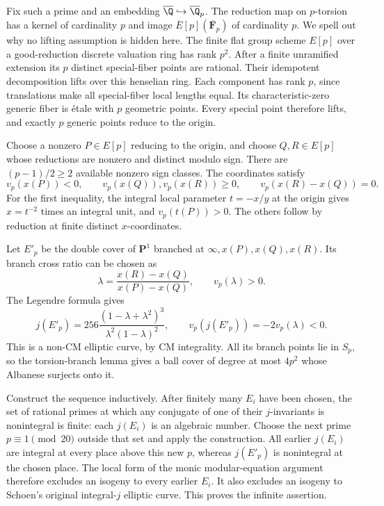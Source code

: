 Fix such a prime and an embedding $\overline{\Q}\hookrightarrow
\overline{\Q}_p$.  The reduction map on $p$-torsion has a kernel of
cardinality $p$ and image $\overline E[p](\overline{\mathbf F}_p)$ of
cardinality $p$.  We spell out why no lifting assumption is hidden here.
The finite flat group scheme $E[p]$ over a good-reduction discrete
valuation ring has rank $p^2$.  After a finite unramified extension its
$p$ distinct special-fiber points are rational.  Their idempotent
decomposition lifts over this henselian ring.  Each component has rank
$p$, since translations make all special-fiber local lengths equal.
Its characteristic-zero generic fiber is \'{e}tale with $p$ geometric
points.  Every special point therefore lifts, and exactly $p$ generic
points reduce to the origin.

Choose a nonzero $P\in E[p]$ reducing to the origin, and choose
$Q,R\in E[p]$ whose reductions are nonzero and distinct modulo sign.
There are $(p-1)/2\geq2$ available nonzero sign classes.  The coordinates
satisfy
\[
 v_p(x(P))<0,\qquad
 v_p(x(Q)),v_p(x(R))\geq0,\qquad
 v_p(x(R)-x(Q))=0.
\]
For the first inequality, the integral local parameter $t=-x/y$ at the
origin gives $x=t^{-2}$ times an integral unit, and $v_p(t(P))>0$.
The others follow by reduction at finite distinct $x$-coordinates.

Let $E'_p$ be the double cover of $\mathbf P^1$ branched at
$\infty,x(P),x(Q),x(R)$.  Its branch cross ratio can be chosen as
\[
 \lambda=\frac{x(R)-x(Q)}{x(P)-x(Q)},\qquad v_p(\lambda)>0.
\]
The Legendre formula gives
\[
 j(E'_p)=256\frac{(1-\lambda+\lambda^2)^3}
                         {\lambda^2(1-\lambda)^2},
 \qquad v_p(j(E'_p))=-2v_p(\lambda)<0.
\]
This is a non-CM elliptic curve, by CM integrality.  All its branch points
lie in $S_p$, so the torsion-branch lemma gives a ball cover of degree at
most $4p^2$ whose Albanese surjects onto it.

Construct the sequence inductively.  After finitely many $E_i$ have been
chosen, the set of rational primes at which any conjugate of one of their
$j$-invariants is nonintegral is finite: each $j(E_i)$ is an algebraic
number.  Choose the next prime $p\equiv1\pmod{20}$ outside that set and
apply the construction.  All earlier $j(E_i)$ are integral at every
place above this new $p$, whereas $j(E'_p)$ is nonintegral at the chosen
place.  The local form of the monic modular-equation argument therefore
excludes an isogeny to every earlier $E_i$.  It also excludes an isogeny
to Schoen's original integral-$j$ elliptic curve.  This proves the infinite
assertion.

